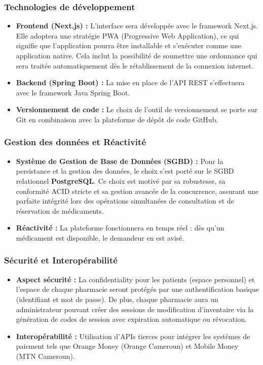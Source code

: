 \documentclass[12pt,a4paper]{report}
\begin{document}
\subsubsection*{Technologies de développement}
\begin{itemize}
    \item \textbf{Frontend (Next.js) :} L'interface sera développée avec le framework Next.js. Elle adoptera une stratégie PWA (Progressive Web Application), ce qui signifie que l'application pourra être installable et s'exécuter comme une application native. Cela inclut la possibilité de soumettre une ordonnance qui sera traitée automatiquement dès le rétablissement de la connexion internet.
    \item \textbf{Backend (Spring Boot) :} La mise en place de l'API REST s'effectuera avec le framework Java Spring Boot.
    \item \textbf{Versionnement de code :} Le choix de l'outil de versionnement se porte sur Git en combinaison avec la plateforme de dépôt de code GitHub.
\end{itemize}

\subsubsection*{Gestion des données et Réactivité}
\begin{itemize}
    \item \textbf{Système de Gestion de Base de Données (SGBD) :} Pour la persistance et la gestion des données, le choix s'est porté sur le SGBD relationnel \textbf{PostgreSQL}. Ce choix est motivé par sa robustesse, sa conformité ACID stricte et sa gestion avancée de la concurrence, assurant une parfaite intégrité lors des opérations simultanées de consultation et de réservation de médicaments.
    \item \textbf{Réactivité :} La plateforme fonctionnera en temps réel : dès qu'un médicament est disponible, le demandeur en est avisé.
\end{itemize}

\subsubsection*{Sécurité et Interopérabilité}
\begin{itemize}
    \item \textbf{Aspect sécurité :} La confidentiality pour les patients (espace personnel) et l'espace de chaque pharmacie seront protégés par une authentification basique (identifiant et mot de passe). De plus, chaque pharmacie aura un administrateur pouvant créer des sessions de modification d'inventaire via la génération de codes de session avec expiration automatique ou révocation.
    \item \textbf{Interopérabilité :} Utilisation d'APIs tierces pour intégrer les systèmes de paiement tels que Orange Money (Orange Cameroun) et Mobile Money (MTN Cameroun).
\end{itemize}
\end{document}
